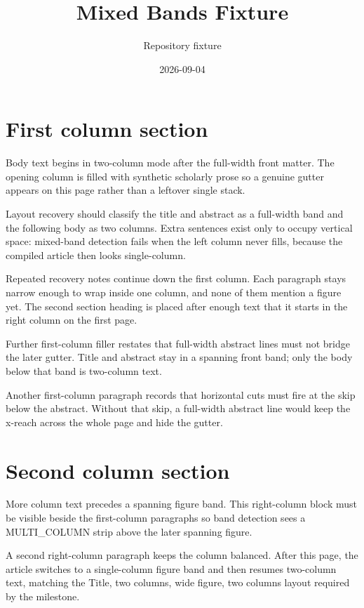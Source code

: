 \documentclass[11pt,a4paper,twocolumn]{article}
\title{Mixed Bands Fixture}
\author{Repository fixture}
\date{2026-09-04}%
\begin{document}
\section{First column section}
Body text begins in two-column mode after the full-width front matter. The
opening column is filled with synthetic scholarly prose so a genuine gutter
appears on this page rather than a leftover single stack.

Layout recovery should classify the title and abstract as a full-width band
and the following body as two columns. Extra sentences exist only to occupy
vertical space: mixed-band detection fails when the left column never
fills, because the compiled article then looks single-column.

Repeated recovery notes continue down the first column. Each paragraph
stays narrow enough to wrap inside one column, and none of them mention a
figure yet. The second section heading is placed after enough text that it
starts in the right column on the first page.

Further first-column filler restates that full-width abstract lines must
not bridge the later gutter. Title and abstract stay in a spanning front
band; only the body below that band is two-column text.

Another first-column paragraph records that horizontal cuts must fire at
the skip below the abstract. Without that skip, a full-width abstract line
would keep the x-reach across the whole page and hide the gutter.

\section{Second column section}
More column text precedes a spanning figure band. This right-column block
must be visible beside the first-column paragraphs so band detection sees
a MULTI\_COLUMN strip above the later spanning figure.

A second right-column paragraph keeps the column balanced. After this
page, the article switches to a single-column figure band and then resumes
two-column text, matching the Title, two columns, wide figure, two columns
layout required by the milestone.
\end{document}

